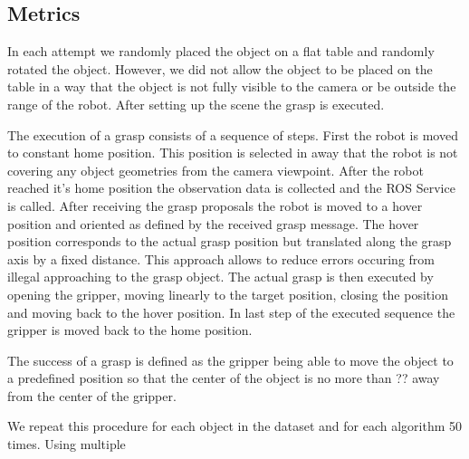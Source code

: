 \subsection{Metrics}
In each attempt we randomly placed the object on a flat table and randomly rotated the object.
However, we did not allow the object to be placed on the table in a way that the object is not fully visible to the camera or be outside the range of the robot.
After setting up the scene the grasp is executed.

The execution of a grasp consists of a sequence of steps.
First the robot is moved to constant home position. This position is selected in away that the robot is not covering any object geometries from the camera viewpoint.
After the robot reached it's home position the observation data is collected and the ROS Service is called.
After receiving the grasp proposals the robot is moved to a hover position and oriented as defined by the received grasp message.
The hover position corresponds to the actual grasp position but translated along the grasp axis by a fixed distance.
This approach allows to reduce errors occuring from illegal approaching to the grasp object.
The actual grasp is then executed by opening the gripper, moving linearly to the target position, closing the position and moving back to the hover position.
In last step of the executed sequence the gripper is moved back to the home position.

The success of a grasp is defined as the gripper being able to move the object to a predefined position so that the center of the object is no more than
?? away from the center of the gripper.

We repeat this procedure for each object in the dataset and for each algorithm 50 times.
Using multiple